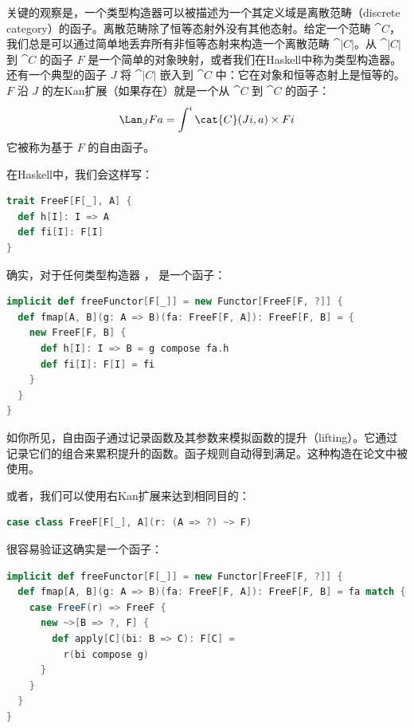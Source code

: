 关键的观察是，一个类型构造器可以被描述为一个其定义域是离散范畴（discrete category）的函子。离散范畴除了恒等态射外没有其他态射。给定一个范畴 $\cat{C}$，我们总是可以通过简单地丢弃所有非恒等态射来构造一个离散范畴 $\cat{|C|}$。从 $\cat{|C|}$ 到 $\cat{C}$ 的函子 $F$ 是一个简单的对象映射，或者我们在Haskell中称为类型构造器。还有一个典型的函子 $J$ 将 $\cat{|C|}$ 嵌入到 $\cat{C}$ 中：它在对象和恒等态射上是恒等的。$F$ 沿 $J$ 的左Kan扩展（如果存在）就是一个从 $\cat{C}$ 到 $\cat{C}$ 的函子：
\[\Lan_{J}F a = \int^i \cat{C}(J i, a)\times{}F i\]
它被称为基于 $F$ 的自由函子。

在Haskell中，我们会这样写：

\begin{lstlisting}[language=Scala]
trait FreeF[F[_], A] {
  def h[I]: I => A
  def fi[I]: F[I]
}
\end{lstlisting}
确实，对于任何类型构造器 ， 是一个函子：

\begin{lstlisting}[language=Scala]
implicit def freeFunctor[F[_]] = new Functor[FreeF[F, ?]] {
  def fmap[A, B](g: A => B)(fa: FreeF[F, A]): FreeF[F, B] = {
    new FreeF[F, B] {
      def h[I]: I => B = g compose fa.h
      def fi[I]: F[I] = fi
    }
  }
}
\end{lstlisting}
如你所见，自由函子通过记录函数及其参数来模拟函数的提升（lifting）。它通过记录它们的组合来累积提升的函数。函子规则自动得到满足。这种构造在论文中被使用。

或者，我们可以使用右Kan扩展来达到相同目的：

\begin{lstlisting}[language=Scala]
case class FreeF[F[_], A](r: (A => ?) ~> F)
\end{lstlisting}
很容易验证这确实是一个函子：

\begin{lstlisting}[language=Scala]
implicit def freeFunctor[F[_]] = new Functor[FreeF[F, ?]] {
  def fmap[A, B](g: A => B)(fa: FreeF[F, A]): FreeF[F, B] = fa match {
    case FreeF(r) => FreeF {
      new ~>[B => ?, F] {
        def apply[C](bi: B => C): F[C] =
          r(bi compose g)
      }
    }
  }
}
\end{lstlisting}

